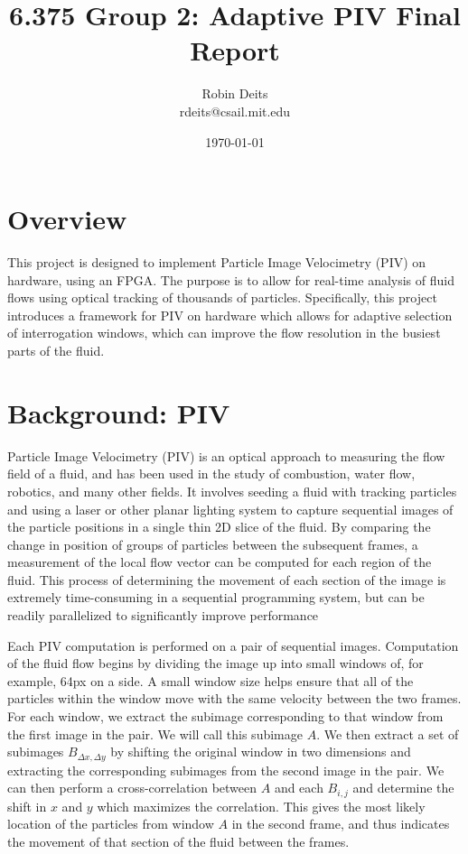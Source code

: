 \documentclass{article}
\begin{document}
	\author{Robin Deits\\ rdeits@csail.mit.edu}
	\title{6.375 Group 2: Adaptive PIV Final Report}
	\date{\today}
	\maketitle

	\tableofcontents

	\section{Overview}
	This project is designed to implement Particle Image Velocimetry (PIV) on hardware, using an FPGA. The purpose is to allow for real-time analysis of fluid flows using optical tracking of thousands of particles. Specifically, this project introduces a framework for PIV on hardware which allows for adaptive selection of interrogation windows, which can improve the flow resolution in the busiest parts of the fluid. 

	\section{Background: PIV} %
	\label{sec:background}
	Particle Image Velocimetry (PIV) is an optical approach to measuring the flow field of a fluid, and has been used in the study of combustion, water flow, robotics, and many other fields. It involves seeding a fluid with tracking particles and using a laser or other planar lighting system to capture sequential images of the particle positions in a single thin 2D slice of the fluid. By comparing the change in position of groups of particles between the subsequent frames, a measurement of the local flow vector can be computed for each region of the fluid. This process of determining the movement of each section of the image is extremely time-consuming in a sequential programming system, but can be readily parallelized to significantly improve performance \citep{Yu:2006tb}

	Each PIV computation is performed on a pair of sequential images. Computation of the fluid flow begins by dividing the image up into small windows of, for example, 64px on a side. A small window size helps ensure that all of the particles within the window move with the same velocity between the two frames. For each window, we extract the subimage corresponding to that window from the first image in the pair. We will call this subimage $A$. We then extract a set of subimages $B_{\Delta x,  \Delta y}$ by shifting the original window in two dimensions and extracting the corresponding subimages from the second image in the pair. We can then perform a cross-correlation between $A$ and each $B_{i, j}$ and determine the shift in $x$ and $y$ which maximizes the correlation. This gives the most likely location of the particles from window $A$ in the second frame, and thus indicates the movement of that section of the fluid between the frames.
\end{document}
